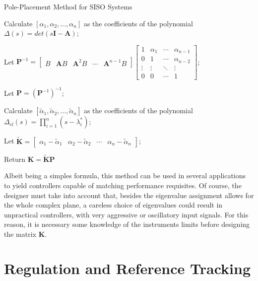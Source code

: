 \documentclass[a4paper,11pt]{book}
\numberwithin{figure}{chapter}
\numberwithin{equation}{chapter}
\numberwithin{table}{chapter}
\theoremstyle{definition}
\begin{document}
\begin{algorithm}[ht]
    \caption{Pole-Placement Method for SISO Systems}    
    \SetAlgoLined
    
    \vskip0.25cm
    
    Calculate $[\alpha_1, \alpha_2, ..., \alpha_n]$ as the coefficients of the polynomial $\Delta(s) = det(s\bm{I} - \bm{A})$;
    
    Let $\bm{P}^{-1} = \begin{bmatrix} B & \bm{A} B & \bm{A}^2 B & \cdots & \bm{A}^{n-1} B \end{bmatrix} \begin{bmatrix}
        1 & \alpha_1 & \cdots  & \alpha_{n-1} \\
        0 & 1 & \cdots & \alpha_{n-2} \\
        \vdots & \vdots & \ddots & \vdots \\
        0 & 0 & \cdots &1
        \end{bmatrix}$;
    
    Let $\bm{P} = \left( \bm{P}^{-1} \right)^{-1}$;
    
    Calculate $[\tilde{\alpha}_1, \tilde{\alpha}_2, ..., \tilde{\alpha}_n]$ as the coefficients of the polynomial $\Delta_{cl}(s) = \prod_{i=1}^n (s - \lambda^*_i)$;
    
    Let $\tilde{\bm{K}} = \begin{bmatrix} \alpha_1 - \tilde{\alpha}_1 & \alpha_2 - \tilde{\alpha}_2 & \cdots & \alpha_n - \tilde{\alpha}_n \end{bmatrix}$;
    
    Return $\bm{K} = \tilde{\bm{K}} \bm{P}$
\end{algorithm} 

Albeit being a simples formula, this method can be used in several applications to yield controllers capable of matching performance requisites. Of course, the designer must take into account that, besides the eigenvalue assignment allows for the whole complex plane, a careless choice of eigenvalues could result in unpractical controllers, with very aggressive or oscillatory input signals. For this reason, it is necessary some knowledge of the instruments limits before designing the matrix $\bm{K}$.

\section{Regulation and Reference Tracking}
\end{document}

